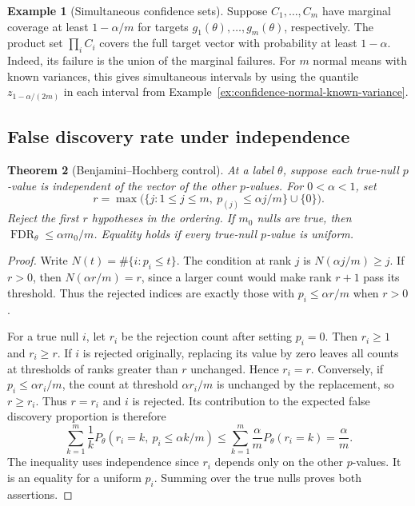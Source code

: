 \documentclass[11pt,oneside]{book}
\newtheorem{theorem}{Theorem}[chapter]
\theoremstyle{definition}
\newtheorem{example}[theorem]{Example}
\theoremstyle{remark}
\begin{document}
\begin{example}[Simultaneous confidence sets]
\label{ex:bonferroni-simultaneous-confidence}
Suppose $C_1,\ldots,C_m$ have marginal coverage at least
$1-\alpha/m$ for targets $g_1(\theta),\ldots,g_m(\theta)$,
respectively. The product set $\prod_i C_i$ covers the full
target vector with probability at least $1-\alpha$. Indeed,
its failure is the union of the marginal failures. For $m$
normal means with known variances, this gives simultaneous
intervals by using the quantile $z_{1-\alpha/(2m)}$ in each
interval from Example~\ref{ex:confidence-normal-known-variance}.
\end{example}

\subsection{False discovery rate under independence}
\label{subsec:benjamini-hochberg}

\begin{theorem}[Benjamini--Hochberg control]
\label{thm:benjamini-hochberg-independence}
At a label $\theta$, suppose each true-null $p$-value is independent
of the vector of the other $p$-values. For $0<\alpha<1$, set
\[
r=\max\bigl(\{j:1\leq j\leq m,\ p_{(j)}\leq\alpha j/m\}\cup\{0\}\bigr).
\]
Reject the first $r$ hypotheses in the ordering. If $m_0$ nulls
are true, then $\operatorname{FDR}_\theta\leq\alpha m_0/m$.
Equality holds if every true-null $p$-value is uniform.
\end{theorem}
\begin{proof}
Write $N(t)=\#\{i:p_i\leq t\}$. The condition at rank $j$
is $N(\alpha j/m)\geq j$. If $r>0$, then
$N(\alpha r/m)=r$, since a larger count would make rank $r+1$
pass its threshold. Thus the rejected indices are exactly those
with $p_i\leq\alpha r/m$ when $r>0$.

For a true null $i$, let $r_i$ be the rejection count after
setting $p_i=0$. Then $r_i\geq1$ and $r_i\geq r$. If $i$ is
rejected originally, replacing its value by zero leaves all
counts at thresholds of ranks greater than $r$ unchanged.
Hence $r_i=r$. Conversely, if $p_i\leq\alpha r_i/m$, the
count at threshold $\alpha r_i/m$ is unchanged by the replacement,
so $r\geq r_i$. Thus $r=r_i$ and $i$ is rejected. Its contribution
to the expected false discovery proportion is therefore
\[
\sum_{k=1}^m \frac{1}{k}
 P_\theta(r_i=k,\ p_i\leq\alpha k/m)
\leq \sum_{k=1}^m \frac{\alpha}{m}P_\theta(r_i=k)
=\frac{\alpha}{m}.
\]
The inequality uses independence since $r_i$ depends only on
the other $p$-values. It is an equality for a uniform $p_i$.
Summing over the true nulls proves both assertions.
\end{proof}
\end{document}
